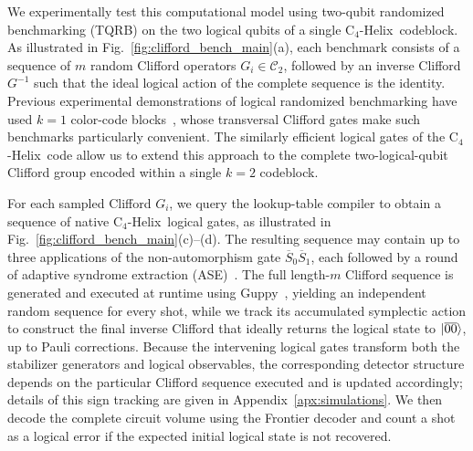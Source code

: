 \documentclass[aps,prx,reprint,showpacs,twocolumn,superscriptaddress,eqsecnum]{revtex4-2}
\newcommand{\chelix}{C$_4$-Helix}
\begin{document}
We experimentally test this computational model using two-qubit randomized benchmarking (TQRB) on the two logical qubits of a single \chelix\ codeblock. As illustrated in Fig.~\ref{fig:clifford_bench_main}(a), each benchmark consists of a sequence of $m$ random Clifford operators $G_i \in \mathcal{C}_2$, followed by an inverse Clifford $G^{-1}$ such that the ideal logical action of the complete sequence is the identity. Previous experimental demonstrations of logical randomized benchmarking have used $k=1$ color-code blocks~\cite{mayer2024, Lacroix_2025}, whose transversal Clifford gates make such benchmarks particularly convenient. The similarly efficient logical gates of the \chelix\ code allow us to extend this approach to the complete two-logical-qubit Clifford group encoded within a single $k=2$ codeblock.



For each sampled Clifford $G_i$, we query the lookup-table compiler to obtain a sequence of native \chelix\ logical gates, as illustrated in Fig.~\ref{fig:clifford_bench_main}(c)--(d). The resulting sequence may contain up to three applications of the non-automorphism gate $\overline{S}_0\overline{S}_1$, each followed by a round of adaptive syndrome extraction (ASE)~\cite{Berthusen_2025}. The full length-$m$ Clifford sequence is generated and executed at runtime using Guppy~\cite{koch2025}, yielding an independent random sequence for every shot, while we track its accumulated symplectic action to construct the final inverse Clifford that ideally returns the logical state to $\ket{\overline{00}}$, up to Pauli corrections. Because the intervening logical gates transform both the stabilizer generators and logical observables, the corresponding detector structure depends on the particular Clifford sequence executed and is updated accordingly; details of this sign tracking are given in Appendix~\ref{apx:simulations}. We then decode the complete circuit volume using the Frontier decoder and count a shot as a logical error if the expected initial logical state is not recovered.
\end{document}
